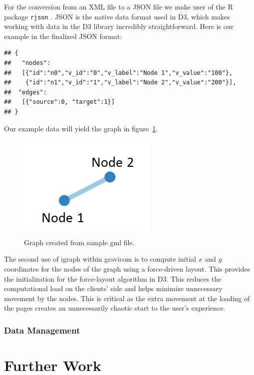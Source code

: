 \documentclass{article}\usepackage[]{graphicx}\usepackage[]{color}
\makeatletter
\newenvironment{kframe}{%
 \def\at@end@of@kframe{}%
 \ifinner\ifhmode%
  \def\at@end@of@kframe{\end{minipage}}%
  \begin{minipage}{\columnwidth}%
 \fi\fi%
 \def\FrameCommand##1{\hskip\@totalleftmargin \hskip-\fboxsep
 \colorbox{shadecolor}{##1}\hskip-\fboxsep
     \hskip-\linewidth \hskip-\@totalleftmargin \hskip\columnwidth}%
 \MakeFramed {\advance\hsize-\width
   \@totalleftmargin\z@ \linewidth\hsize
   \@setminipage}}%
 {\par\unskip\endMakeFramed%
 \at@end@of@kframe}
\newenvironment{knitrout}{}{} %
\makeatother
\begin{document}
For the conversion from an  XML file  to a JSON file we make user of the R package {\tt rjson} \cite{acb-rjson}.  JSON is the native data format used in D3, which  makes working with data in the D3 library incredibly straightforward. Here is our example in the finalized JSON format:
\begin{knitrout}
\color{fgcolor}\begin{kframe}
\begin{verbatim}
## {
##   "nodes":
##   [{"id":"n0","v_id":"0","v_label":"Node 1","v_value":"100"}, 
##    {"id":"n1","v_id":"1","v_label":"Node 2","v_value":"200"}], 
##  "edges":
##   [{"source":0, "target":1}]
## }
\end{verbatim}
\end{kframe}
\end{knitrout}

Our example data will yield the graph in figure~\ref{fig:samplegraph}.

\begin{figure}[hbtp]
\centering
\includegraphics{images/samplegraph.png}
\caption{\label{fig:samplegraph} Graph created from sample gml file.}
\end{figure}
The second use of igraph within gravicom is to compute initial $x$ and $y$ coordinates for the nodes of the graph using a force-driven layout. This provides the initialization for the force-layout algorithm in D3. This reduces the computational load on the clients' side and helps minimize unnecessary movement by the nodes. This is critical as the extra movement at the loading of the pages creates an unnecessarily chaotic start to the user's experience. 




\subsubsection{Data Management}


\section{Further Work}

\printbibliography
\end{document}
